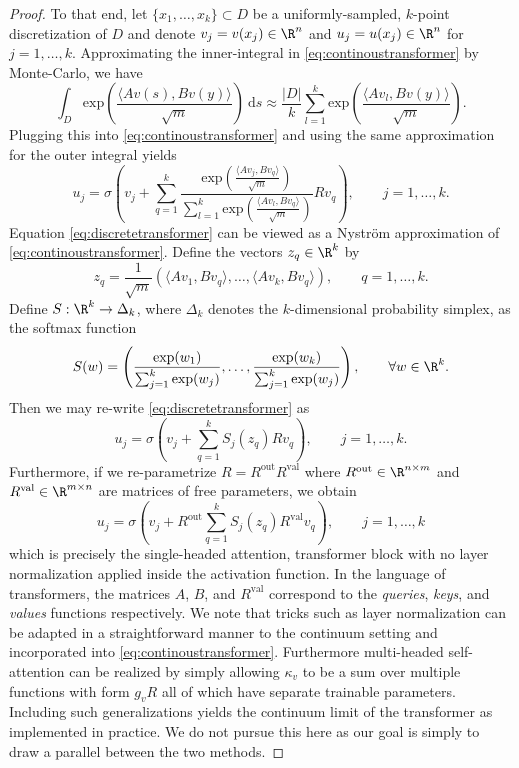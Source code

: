 {\begin{proof}
To that end, let \(\{x_1,\dots,x_k\} \subset D\) be a uniformly-sampled, \(k\)-point discretization of \(D\) and denote \(v_j = v(x_j) \in \R^n\) and
\(u_j = u(x_j) \in \R^n\) for \(j=1,\dots,k\). Approximating the inner-integral in \eqref{eq:continoustransformer} by Monte-Carlo, we have
\[\int_D \text{exp}\left( \frac{\langle A v(s), Bv(y) \rangle}{\sqrt{m}} \right ) \: \text{d}s \approx \frac{|D|}{k} \sum_{l=1}^k \text{exp} \left ( \frac{\langle A v_l, B v(y) \rangle}{\sqrt{m}} \right ).\]
Plugging this into \eqref{eq:continoustransformer} and using the same approximation for the outer integral yields
\begin{equation}
    \label{eq:discretetransformer}
    u_j = \sigma \left ( v_j + \sum_{q=1}^k \frac{\text{exp} \left ( \frac{\langle A v_j, Bv_q \rangle}{\sqrt{m}} \right )}{\sum_{l=1}^k \text{exp} \left ( \frac{\langle A v_l, B v_q \rangle}{\sqrt{m}} \right )} R v_q \right ), \qquad j=1,\dots,k.
\end{equation}
Equation \eqref{eq:discretetransformer} can be viewed as a Nystr{\"o}m approximation of \eqref{eq:continoustransformer}. Define the vectors \(z_q \in \R^k\) by
\[z_q = \frac{1}{\sqrt{m}} (\langle Av_1, Bv_q \rangle, \dots, \langle Av_k, Bv_q \rangle), \qquad q=1,\dots,k.\]
Define \(S : \R^k \to \Delta_k\), where \(\Delta_k\) denotes the \(k\)-dimensional probability simplex, as the softmax function
\[S(w) = \left ( \frac{\text{exp}(w_1)}{\sum_{j=1}^k \text{exp}(w_j)}, \dots, \frac{\text{exp}(w_k)}{\sum_{j=1}^k \text{exp}(w_j)} \right ), \qquad \forall w \in \R^k.\]
Then we may re-write \eqref{eq:discretetransformer} as
\[u_j = \sigma \left ( v_j + \sum_{q=1}^k S_j (z_q) R v_q \right ), \qquad j=1,\dots,k.\]
Furthermore, if we re-parametrize \(R = R^{\text{out}} R^{\text{val}}\) where \(R^{\text{out}} \in \R^{n \times m}\) and \(R^{\text{val}} \in \R^{m \times n}\) are matrices of free parameters, we obtain
\[u_j = \sigma \left ( v_j + R^{\text{out}}\sum_{q=1}^k S_j (z_q) R^{\text{val}} v_q \right ), \qquad j=1,\dots,k\]
which is precisely the single-headed attention, transformer block with no layer normalization applied inside the activation function. In the language of transformers, the matrices \(A\), \(B\), and \(R^{\text{val}}\) correspond to the \textit{queries}, \textit{keys}, and \textit{values} functions respectively. We note that tricks such as layer normalization \citep{ba2016layer} can be  adapted in a
straightforward manner to the continuum setting and incorporated into \eqref{eq:continoustransformer}. Furthermore multi-headed self-attention can be realized by simply allowing \(\kappa_v\) to be a sum over multiple functions with form \(g_v R\) all of which have separate trainable parameters. Including such generalizations yields the continuum limit of the transformer as implemented in practice. We do not pursue this here as our goal is simply to draw a parallel between the two methods.
\end{proof}

}
